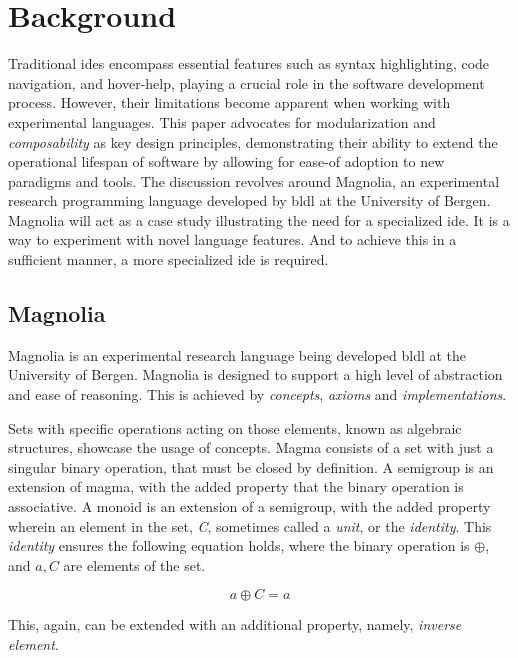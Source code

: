 \chapter{Background}

Traditional \gls{ide}s encompass essential features such as syntax highlighting, code
navigation, and hover-help, playing a crucial role in the software development
process. However, their limitations become apparent when working with
experimental languages. This paper advocates for modularization and
\textit{composability} as key design principles, demonstrating their ability to
extend the operational lifespan of software by allowing for ease-of adoption to
new paradigms and tools. The discussion revolves around Magnolia, an
experimental research programming language developed by \gls{bldl} at the
University of Bergen. Magnolia will act as a case study illustrating the need for
a specialized \gls{ide}. It is a way to experiment with novel language features.
And to achieve this in a sufficient manner, a more specialized \gls{ide} is
required.

\section{Magnolia}

Magnolia is an experimental research language being developed \gls{bldl} at the
University of Bergen. Magnolia is designed to support a high level of abstraction
and ease of reasoning. This is achieved by \textit{concepts}, \textit{axioms} and
\textit{implementations}.

Sets with specific operations acting on those elements, known as algebraic
structures, showcase the usage of concepts. Magma consists of a set with just a
singular binary operation, that must be closed by definition. A semigroup is an
extension of magma, with the added property that the binary operation is
associative. A monoid is an extension of a semigroup, with the added property
wherein an element in the set, \textit{C}, sometimes called a \textit{unit}, or
the \textit{identity}. This \textit{identity} ensures the following equation
holds, where the binary operation is $ \oplus $, and $ a, C $ are elements of the set.

\begin{equation}
  a \oplus C = a
\end{equation}

This, again, can be extended with an additional property, namely,
\textit{inverse element}.


